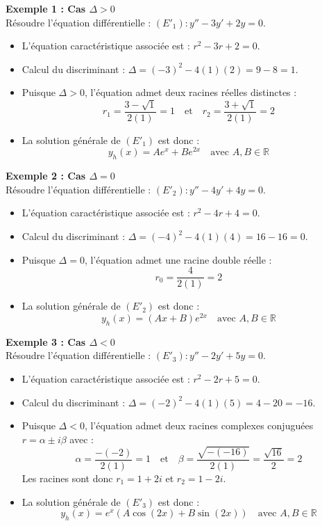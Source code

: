 \documentclass[12pt,a4paper]{article}
\begin{document}
\textbf{Exemple 1 : Cas $\Delta > 0$} \\
Résoudre l'équation différentielle : $(E'_1) : y'' - 3y' + 2y = 0$.
\begin{itemize}
    \item L'équation caractéristique associée est : $r^2 - 3r + 2 = 0$.
    \item Calcul du discriminant : $\Delta = (-3)^2 - 4(1)(2) = 9 - 8 = 1$.
    \item Puisque $\Delta > 0$, l'équation admet deux racines réelles distinctes :
    \[ r_1 = \frac{3 - \sqrt{1}}{2(1)} = 1 \quad \text{et} \quad r_2 = \frac{3 + \sqrt{1}}{2(1)} = 2 \]
    \item La solution générale de $(E'_1)$ est donc :
    \[ \boxed{y_h(x) = A e^{x} + B e^{2x}} \quad \text{avec } A, B \in \mathbb{R} \]
\end{itemize}

\medskip

\textbf{Exemple 2 : Cas $\Delta = 0$} \\
Résoudre l'équation différentielle : $(E'_2) : y'' - 4y' + 4y = 0$.
\begin{itemize}
    \item L'équation caractéristique associée est : $r^2 - 4r + 4 = 0$.
    \item Calcul du discriminant : $\Delta = (-4)^2 - 4(1)(4) = 16 - 16 = 0$.
    \item Puisque $\Delta = 0$, l'équation admet une racine double réelle :
    \[ r_0 = \frac{4}{2(1)} = 2 \]
    \item La solution générale de $(E'_2)$ est donc :
    \[ \boxed{y_h(x) = (Ax + B)e^{2x}} \quad \text{avec } A, B \in \mathbb{R} \]
\end{itemize}

\medskip

\textbf{Exemple 3 : Cas $\Delta < 0$} \\
Résoudre l'équation différentielle : $(E'_3) : y'' - 2y' + 5y = 0$.
\begin{itemize}
    \item L'équation caractéristique associée est : $r^2 - 2r + 5 = 0$.
    \item Calcul du discriminant : $\Delta = (-2)^2 - 4(1)(5) = 4 - 20 = -16$.
    \item Puisque $\Delta < 0$, l'équation admet deux racines complexes conjuguées $r = \alpha \pm i\beta$ avec :
    \[ \alpha = \frac{-(-2)}{2(1)} = 1 \quad \text{et} \quad \beta = \frac{\sqrt{-(-16)}}{2(1)} = \frac{\sqrt{16}}{2} = 2 \]
    Les racines sont donc $r_1 = 1 + 2i$ et $r_2 = 1 - 2i$.
    \item La solution générale de $(E'_3)$ est donc :
    \[ \boxed{y_h(x) = e^{x} \left( A\cos(2x) + B\sin(2x) \right)} \quad \text{avec } A, B \in \mathbb{R} \]
\end{itemize}
\end{document}
